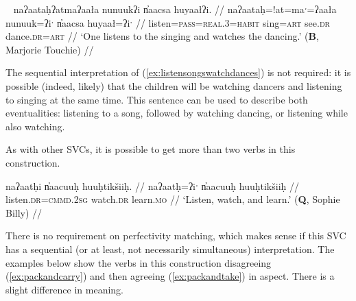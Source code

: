 \ex~ \label{ex:listensongswatchdances}
\begingl
\glpreamble naʔaataḥʔatmaʔaała nunuukʔi n̓aacsa huyaałʔi. //
\gla naʔaataḥ=!at=maˑ=ʔaała nunuuk=ʔiˑ n̓aacsa huyaał=ʔiˑ //
\glb listen=\textsc{pass}=\textsc{real.3}=\textsc{habit} sing=\textsc{art} see.\textsc{dr} dance.\textsc{dr}=\textsc{art} //
\glft `One listens to the singing and watches the dancing.' (\textbf{B}, Marjorie Touchie) //
\endgl
\xe

The sequential interpretation of (\ref{ex:listensongswatchdances}) is not required: it is possible (indeed, likely) that the children will be watching dancers and listening to singing at the same time. This sentence can be used to describe both eventualities: listening to a song, followed by watching dancing, or listening while also watching.

\begin{comment}
It is possible for both verbs in this kind of SVC to share a single direct object. [[Comment: Below be recategorized as Type 1?]]

TODO recast the below

\ex \label{ex:listenrespect}
\begingl
\glpreamble naʔaataḥʔaqƛ̓iʔaał ʔiisaak ʔuukʷił ʔaʔiič̓um. //
\gla naʔaataḥ=!aqƛ=!iˑ=ʔaał ʔiisaak ʔu-L.(č)ił ʔaʔiič̓um //
\glb listen.\textsc{dr}=\textsc{fut}=\textsc{cmmd.2sg}=\textsc{habit} respect.\textsc{dr} \textsc{x}-do.to elder.\textsc{pl} //
\glft `Listen to and respect the elders.' (\textbf{C}, \textit{tupaat} Julia Lucas) //
\endgl
\xe


\end{comment}

As with other SVCs, it is possible to get more than two verbs in this construction.

\ex \label{ex:listenwtachlearn}
\begingl
\glpreamble naʔaatḥi n̓aacuuḥ huuḥtikšiiḥ. //
\gla naʔaatḥ=ʔiˑ n̓aacuuḥ huuḥtikšiiḥ //
\glb listen.\textsc{dr}=\textsc{cmmd.2sg} watch.\textsc{dr} learn.\textsc{mo} //
\glft `Listen, watch, and learn.' (\textbf{Q}, Sophie Billy) //
\endgl
\xe

There is no requirement on perfectivity matching, which makes sense if this SVC has a sequential (or at least, not necessarily simultaneous) interpretation. The examples below show the verbs in this construction disagreeing (\ref{ex:packandcarry}) and then agreeing (\ref{ex:packandtake}) in aspect. There is a slight difference in meaning.

